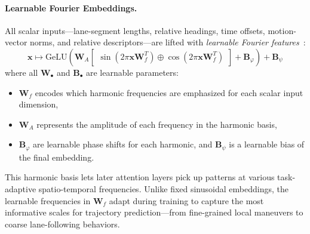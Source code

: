 \paragraph{Learnable Fourier Embeddings.}
All scalar inputs—lane-segment lengths, relative headings, time offsets, motion-vector norms, and relative descriptors—are lifted with \emph{learnable Fourier features}~\cite{li2021llearnableFourier}:
\begin{equation}
  \label{eq:learnable_fourier_embedding}
\mathbf{x} \mapsto \text{GeLU}\left(\mathbf{W}_A \begin{bmatrix} \sin(2\pi \mathbf{x} \mathbf{W}_f^T) \oplus \cos(2\pi \mathbf{x} \mathbf{W}_f^T) \end{bmatrix} + \mathbf{B}_\varphi\right) + \mathbf{B}_\psi
\end{equation}
where all \(\mathbf{W}_\bullet\) and \(\mathbf{B}_\bullet\) are learnable parameters:
\begin{itemize}[leftmargin=*]
    \item \(\mathbf{W}_f\) encodes which harmonic frequencies are emphasized for each scalar input dimension,
    \item \(\mathbf{W}_A\) represents the amplitude of each frequency in the harmonic basis,
    \item \(\mathbf{B}_\varphi\) are learnable phase shifts for each harmonic, and \(\mathbf{B}_\psi \) is a learnable bias of the final embedding.
\end{itemize}
This harmonic basis lets later attention layers pick up patterns at various task-adaptive spatio-temporal frequencies. Unlike fixed sinusoidal embeddings, the learnable frequencies in \(\mathbf{W}_f\) adapt during training to capture the most informative scales for trajectory prediction—from fine-grained local maneuvers to coarse lane-following behaviors.



